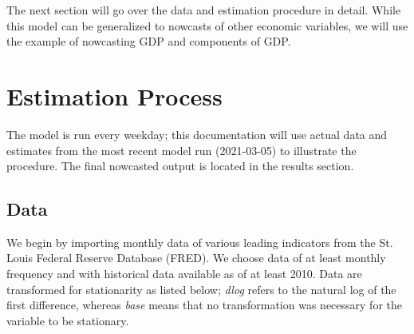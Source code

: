 \documentclass[11pt, letterpaper]{article}\usepackage[]{graphicx}\usepackage[]{color}
\begin{document}
The next section will go over the data and estimation procedure in detail. While this model can be generalized to nowcasts of other economic variables, we will use the example of nowcasting GDP and components of GDP.

\newpage
\section{Estimation Process}
The model is run every weekday; this documentation will use actual data and estimates from the most recent model run (2021-03-05) to illustrate the procedure. The final nowcasted output is located in the results section.

\subsection{Data}
We begin by importing monthly data of various leading indicators from the St. Louis Federal Reserve Database (FRED). We choose data of at least monthly frequency and with historical data available as of at least 2010. Data are transformed for stationarity as listed below; \textit{dlog} refers to the natural log of the first difference, whereas \textit{base} means that no transformation was necessary for the variable to be stationary.
\end{document}
